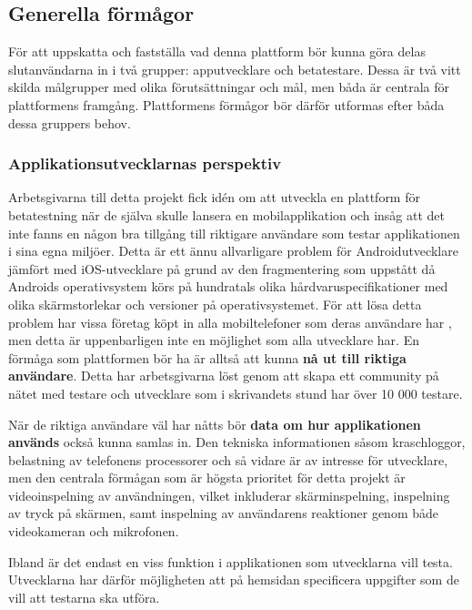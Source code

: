 \subsection{Generella förmågor}
\label{subsec:generalcapabilities}
För att uppskatta och fastställa vad denna plattform bör kunna göra delas slutanvändarna in i två grupper: apputvecklare och betatestare. Dessa är två vitt skilda målgrupper med olika förutsättningar och mål, men båda är centrala för plattformens framgång. Plattformens förmågor bör därför utformas efter båda dessa gruppers behov. 

\subsubsection{Applikationsutvecklarnas perspektiv}
Arbetsgivarna till detta projekt fick idén om att utveckla en plattform för betatestning när de själva skulle lansera en mobilapplikation och insåg att det inte fanns en någon bra tillgång till riktigare användare som testar applikationen i sina egna miljöer. Detta är ett ännu allvarligare problem för Androidutvecklare jämfört med iOS-utvecklare på grund av den fragmentering som uppstått då Androids operativsystem körs på hundratals olika hårdvaruspecifikationer med olika skärmstorlekar och versioner på operativsystemet. För att lösa detta problem har vissa företag köpt in alla mobiltelefoner som deras användare har \parencite{buyAllPhones}, men detta är uppenbarligen inte en möjlighet som alla utvecklare har. En förmåga som plattformen bör ha är alltså att kunna {\bfseries nå ut till riktiga användare}. Detta har arbetsgivarna löst genom att skapa ett community på nätet med testare och utvecklare som i skrivandets stund har över 10 000 testare\parencite{betafamily}.

När de riktiga användare väl har nåtts bör {\bfseries data om hur applikationen används} också kunna samlas in. Den tekniska informationen såsom kraschloggor, belastning av telefonens processorer och så vidare är av intresse för utvecklare, men den centrala förmågan som är högsta prioritet för detta projekt är videoinspelning av användningen, vilket inkluderar skärminspelning, inspelning av tryck på skärmen, samt inspelning av användarens reaktioner genom både videokameran och mikrofonen. 

Ibland är det endast en viss funktion i applikationen som utvecklarna vill testa. Utvecklarna har därför möjligheten att på hemsidan specificera uppgifter som de vill att testarna ska utföra. 

